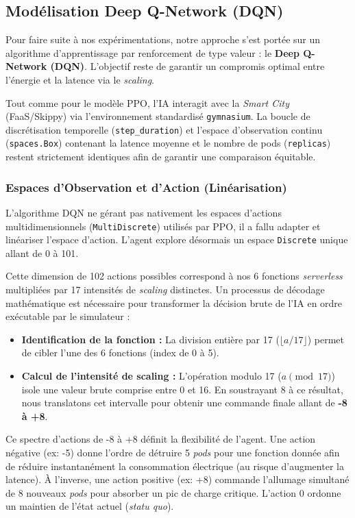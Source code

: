 \documentclass[11pt,a4paper]{article}
\begin{document}
\subsection{Modélisation Deep Q-Network (DQN)}
\label{sec:dqn}

Pour faire suite à nos expérimentations, notre approche s'est portée sur un algorithme d'apprentissage par renforcement de type valeur : le \textbf{Deep Q-Network (DQN)}. L'objectif reste de garantir un compromis optimal entre l'énergie et la latence via le \textit{scaling}.

Tout comme pour le modèle PPO, l'IA interagit avec la \textit{Smart City} (FaaS/Skippy) via l'environnement standardisé \texttt{gymnasium}. La boucle de discrétisation temporelle (\texttt{step\_duration}) et l'espace d'observation continu (\texttt{spaces.Box}) contenant la latence moyenne et le nombre de pods (\texttt{replicas}) restent strictement identiques afin de garantir une comparaison équitable.

\subsubsection{Espaces d'Observation et d'Action (Linéarisation)}
L'algorithme DQN ne gérant pas nativement les espaces d'actions multidimensionnels (\texttt{MultiDiscrete}) utilisés par PPO, il a fallu adapter et linéariser l'espace d'action. L'agent explore désormais un espace \texttt{Discrete} unique allant de 0 à 101. 

Cette dimension de 102 actions possibles correspond à nos 6 fonctions \textit{serverless} multipliées par 17 intensités de \textit{scaling} distinctes. Un processus de décodage mathématique est nécessaire pour transformer la décision brute de l'IA en ordre exécutable par le simulateur :
\begin{itemize}
    \item \textbf{Identification de la fonction :} La division entière par 17 (\(\lfloor a / 17 \rfloor\)) permet de cibler l'une des 6 fonctions (index de 0 à 5).
    \item \textbf{Calcul de l'intensité de scaling :} L'opération modulo 17 (\(a \pmod{17}\)) isole une valeur brute comprise entre 0 et 16. En soustrayant 8 à ce résultat, nous translatons cet intervalle pour obtenir une commande finale allant de \textbf{-8 à +8}.
\end{itemize}

Ce spectre d'actions de -8 à +8 définit la flexibilité de l'agent. Une action négative (ex: -5) donne l'ordre de détruire 5 \textit{pods} pour une fonction donnée afin de réduire instantanément la consommation électrique (au risque d'augmenter la latence). À l'inverse, une action positive (ex: +8) commande l'allumage simultané de 8 nouveaux \textit{pods} pour absorber un pic de charge critique. L'action 0 ordonne un maintien de l'état actuel (\textit{statu quo}).
\end{document}
